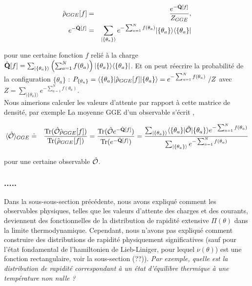 	\begin{eqnarray}
		\hat{\mathbf{\rho}}_{GGE}[f] & = & \frac{e^{-\hat{\mathbf{Q}}[f]}}{Z_{GGE}}, \\
		e^{-\hat{\mathbf{Q}}[f]} & = & 	\sum_{\vert \{\theta_a \} \rangle } e^{- \sum_{a = 1}^N f(\theta_a) } \vert \{ \theta_a\} \rangle \langle  \{ \theta_a\}  \vert 
	\end{eqnarray}
 
	
	pour une certaine fonction $f$ relié à la charge $\hat{\mathbf{Q}} [f]  = \sum_{\vert \{\theta_a \} \rangle } \left ( \sum_{a = 1}^N f ( \theta_a )  \right ) \vert \{ \theta_a \} \rangle \langle \{ \theta_a \} \vert $.
	Et on peut réecrire la probabilité de la configuration $\{\theta_a\}$ : $ P_{\{ \theta_a \}} = \langle \{ \theta_a \}\vert \operator{\rho}_{GGE}[f] \vert  \{ \theta_a \} \rangle = e^{-\sum_{a = 1}^N f(\theta_a)} / Z $ avec $Z = \sum_{\vert \{\theta_a \} \rangle } e^{-\sum_{a = 1}^N f(\theta_a)}$.\\
	
	 Nous aimerions calculer les valeurs d'attente par rapport à cette matrice de densité, par exemple
	La moyenne GGE d'un observable s'écrit ,
	
	\begin{eqnarray}
		\langle \hat{\mathbf{\mathcal{O}}} \rangle_{GGE} & \doteq & \displaystyle  \frac{\text{Tr} (\hat{\mathbf{\mathcal{O}}}\hat{\mathbf{\rho}}_{GGE}[f])}{\text{Tr} (\hat{\mathbf{\rho}}_{GGE}[f])} = \frac{\text{Tr} (\hat{\mathbf{\mathcal{O}}}e^{-\hat{\mathbf{Q}}[f]})}{\text{Tr} (e^{-\hat{\mathbf{Q}}[f]})}	 = \frac{ \sum_{\vert \{\theta_a \}\rangle} \langle  \{ \theta_a\}  \vert   \hat{\mathbf{\mathcal{O}}} \vert \{ \theta_a\} \rangle e^{- \sum_{a = 1}^N f(\theta_a) }  }{\sum_{\vert  \{\theta_a  \} \rangle} e^{- \sum_{a = 1}^N  f(\theta_a) } }
	\end{eqnarray}
		
	pour une certaine observable $\hat{\mathbf{\mathcal{O}}}$.\\

\subsubsection{.....}
	
	Dans la sous-sous-section précédente, nous avons expliqué comment les observables physiques, telles que les valeurs d'attente des charges et des courants, deviennent des fonctionnelles de la distribution de rapidité extensive $\Pi(\theta)$ dans la limite thermodynamique. Cependant, nous n'avons pas expliqué comment construire des distributions de rapidité physiquement significatives (sauf pour l'état fondamental de l'hamiltonien de Lieb-Liniger, pour lequel $\nu(\theta)$) est une fonction rectangulaire, voir la sous-section (??)). {\em Par exemple, quelle est la distribution de rapidité correspondant à un état d'équilibre thermique à une température non nulle ?}\\
	
